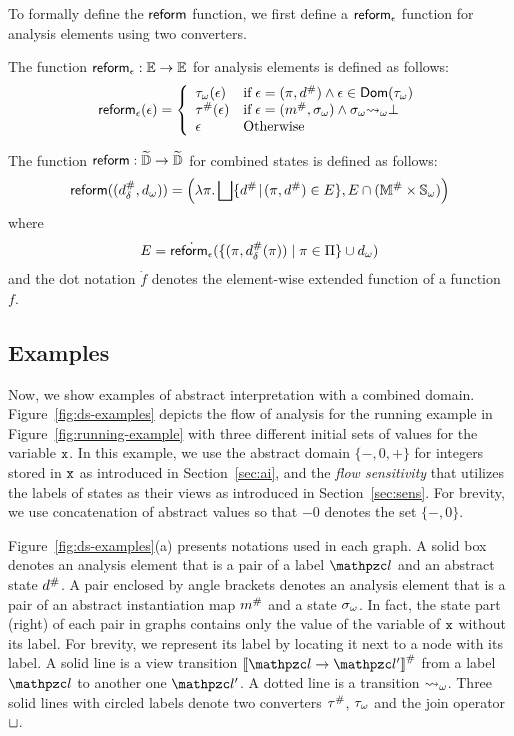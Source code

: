 To formally define the $\reform$ function, we first define a $\areform$ function
for analysis elements using two converters.
\begin{definition}[$\areform$]\label{def:areform}
  The function $\textsf{reform}_\epsilon: \mathbb{E} \rightarrow \mathbb{E}$ for analysis elements
  is defined as follows:
  \[
    \textsf{reform}_\epsilon(\epsilon) = \left\{
      \begin{array}{ll}
        {\tau}_\omega(\epsilon)
        & \text{if} \; \epsilon = (\pi, {d}^{\#}) \wedge \epsilon \in
        \textsf{Dom}({\tau}_\omega)\\
        {\tau}^{\#}(\epsilon)
        & \text{if} \; \epsilon = ({m}^{\#}, {\sigma}_\omega) \wedge {\sigma}_\omega {\leadsto}_\omega
        \bot\\
        \epsilon
        & \text{Otherwise}
      \end{array}
    \right.
  \]
\end{definition}
\begin{definition}[$\reform$]\label{def:reform}
  The  function $\textsf{reform}: \widetilde{\mathbb{D}} \rightarrow \widetilde{\mathbb{D}}$ for combined
  states is defined as follows:
  \[
    \textsf{reform}(({{d}^{\#}_\delta}, {{d}_\omega})) = \left(
      \lambda \pi. \bigsqcup \{ {d}^{\#} \!\mid\! (\pi, {d}^{\#}) \in E \},
      E \cap ({\mathbb{M}}^{\#} \times {\mathbb{S}}_\omega)
    \right)
  \]
  where
  \[
    E = \dot{\textsf{reform}_\epsilon}(\{ (\pi, {{d}^{\#}_\delta}(\pi)) \mid \pi \in \Pi \} \cup {{d}_\omega})
  \]
and the dot notation $\dot{f}$ denotes the element-wise extended function of a
function $f$.
\end{definition}


\subsection{Examples}
Now, we show examples of abstract interpretation with a combined domain.
Figure~\ref{fig:ds-examples} depicts the flow of analysis for the running
example in Figure~\ref{fig:running-example} with three different initial sets of
values for the variable $\texttt{x}$.  In this example, we use the abstract domain
$\{ -, 0, + \}$ for integers stored in $\texttt{x}$ as introduced in
Section~\ref{sec:ai}, and the \textit{flow sensitivity} that utilizes the
labels of states as their views as introduced in Section~\ref{sec:sens}.
For brevity, we use concatenation of abstract values so that
$-0$ denotes the set $\{ -, 0 \}$.

Figure~\ref{fig:ds-examples}(a) presents notations used in each graph. A solid
box denotes an analysis element that is a pair of a label $\lab$ and an abstract
state ${d}^{\#}$.  A pair enclosed by angle brackets denotes an analysis
element that is a pair of an abstract instantiation map ${m}^{\#}$ and a {\sealed}
state ${\sigma}_\omega$.  In fact, the {\sealed} state part (right) of
each pair in graphs contains only the value of the variable of $\texttt{x}$ without
its label.  For brevity, we represent its label by locating it next to
a node with its label.  A solid line is a view transition
$\viewtrans{\lab}{\lab'}$ from a label $\lab$ to another one $\lab'$.  A dotted
line is a {\sealed} transition ${\leadsto}_\omega$.  Three solid lines with
circled labels denote two converters ${\tau}^{\#}$, ${\tau}_\omega$ and the join
operator $\sqcup$.

